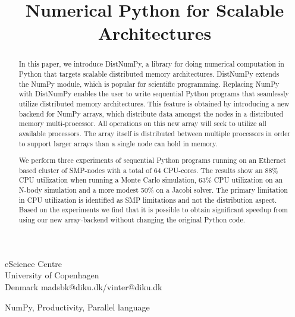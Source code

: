 \documentclass{sigplanconf}
\begin{document}


\title{Numerical Python for Scalable Architectures}

           {eScience Centre\\ University of Copenhagen\\ Denmark}
           {madsbk@diku.dk/vinter@diku.dk}

\maketitle

\begin{abstract}
In this paper, we introduce DistNumPy, a library for doing numerical computation in Python that targets scalable distributed memory architectures. DistNumPy extends the NumPy module\cite{numpy}, which is popular for scientific programming. Replacing NumPy with DistNumPy enables the user to write sequential Python programs that seamlessly utilize distributed memory architectures. This feature is obtained by introducing a new backend for NumPy arrays, which distribute data amongst the nodes in a distributed memory multi-processor. All operations on this new array will seek to utilize all available processors. The array itself is distributed between multiple processors in order to support larger arrays than a single node can hold in memory. 

We perform three experiments of sequential Python programs running on an Ethernet based cluster of SMP-nodes with a total of 64 CPU-cores. The results show an 88\% CPU utilization when running a Monte Carlo simulation, 63\% CPU utilization on an N-body simulation and a more modest 50\% on a Jacobi solver. The primary limitation in CPU utilization is identified as SMP limitations and not the distribution aspect. Based on the experiments we find that it is possible to obtain significant speedup from using our new array-backend without changing the original Python code.
\end{abstract}



\keywords
NumPy, Productivity, Parallel language
\end{document}
